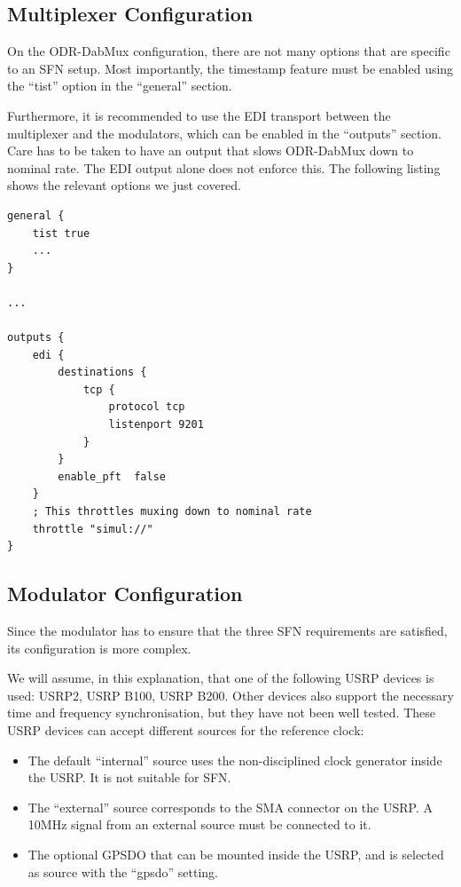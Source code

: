 
\subsection{Multiplexer Configuration}
On the ODR-DabMux configuration, there are not many options that are specific to
an SFN setup.
Most importantly, the timestamp feature must be enabled using the ``tist'' option in
the ``general'' section.

Furthermore, it is recommended to use the EDI transport between the
multiplexer and the modulators, which can be enabled in the ``outputs'' section.
Care has to be taken to have an output that slows ODR-DabMux down to nominal
rate. The EDI output alone does not enforce this. The following listing shows
the relevant options we just covered.

\begin{lstlisting}
general {
    tist true
    ...
}

...

outputs {
    edi {
        destinations {
            tcp {
                protocol tcp
                listenport 9201
            }
        }
        enable_pft  false
    }
    ; This throttles muxing down to nominal rate
    throttle "simul://"
}
\end{lstlisting}

\subsection{Modulator Configuration}
Since the modulator has to ensure that the three SFN requirements are satisfied,
its configuration is more complex.

We will assume, in this explanation, that one of the following USRP devices is
used: USRP2, USRP B100, USRP B200. Other devices also support the necessary time
and frequency synchronisation, but they have not been well tested. These USRP
devices can accept different sources for the reference clock:
\begin{itemize}
    \item The default ``internal'' source uses the non-disciplined
        clock generator inside the USRP. It is not suitable for SFN.
    \item The ``external'' source corresponds to the SMA connector on
        the USRP. A 10MHz signal from an external source must be connected to
        it.
    \item The optional GPSDO that can be mounted inside the USRP, and is
        selected as source with the ``gpsdo'' setting.
\end{itemize}

